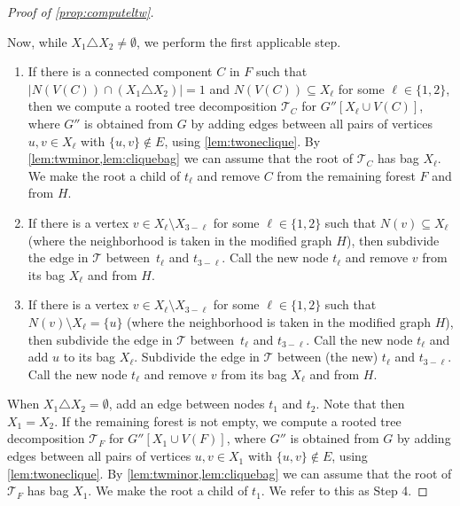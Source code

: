 \documentclass[a4paper,UKenglish,cleveref, autoref, thm-restate, numberwithinsect]{lipics-v2021}
\begin{document}
\begin{proof}[Proof of \cref{prop:computeltw}]
\begin{itemize}
\end{itemize}
Now, while $X_1\triangle X_2\neq \emptyset$, we perform the first applicable step.
\begin{enumerate}
\item If there is a connected component $C$ in $F$ such that $|N(V(C))\cap (X_1\triangle X_2)|=1$ and $N(V(C))\subseteq X_\ell$ for some $\ell\in\{1,2\}$, then we compute a rooted tree decomposition $\mathcal{T}_C$ for $G''[X_\ell\cup V(C)]$, where $G''$ is obtained from $G$ by adding edges between all pairs of vertices $u,v\in  X_\ell$ with $\{u,v\}\notin E$, using \cref{lem:twoneclique}. By \cref{lem:twminor,lem:cliquebag} we can assume that the root of $\mathcal{T}_C$ has bag $X_\ell$. We make the root a child of $t_\ell$ and remove $C$ from the remaining forest $F$ and from $H$. \label{ltw:1}
\item If there is a vertex $v\in X_\ell\setminus X_{3-\ell}$  for some $\ell\in\{1,2\}$ such that $N(v)\subseteq X_\ell$ (where the neighborhood is taken in the modified graph $H$), then subdivide the edge in $\mathcal{T}$ between~$t_\ell$ and $t_{3-\ell}$. Call the new node $t_\ell$ and remove $v$ from its bag $X_\ell$ and from $H$.\label{ltw:2}
\item If there is a vertex $v\in X_\ell\setminus X_{3-\ell}$  for some $\ell\in\{1,2\}$ such that $N(v)\setminus X_\ell=\{u\}$ (where the neighborhood is taken in the modified graph $H$), then subdivide the edge in $\mathcal{T}$ between~$t_\ell$ and $t_{3-\ell}$. Call the new node $t_\ell$ and add $u$ to its bag $X_\ell$. 
Subdivide the edge in $\mathcal{T}$ between (the new) $t_\ell$ and $t_{3-\ell}$. Call the new node $t_\ell$ and remove $v$ from its bag $X_\ell$ and from $H$.\label{ltw:3}
\end{enumerate}
When $X_1\triangle X_2= \emptyset$, add an edge between nodes $t_1$ and $t_2$. Note that then $X_1=X_2$. If the remaining forest is not empty, we compute a rooted tree decomposition $\mathcal{T}_F$ for $G''[X_1\cup V(F)]$, where $G''$ is obtained from $G$ by adding edges between all pairs of vertices $u,v\in  X_1$ with $\{u,v\}\notin E$, using \cref{lem:twoneclique}. By \cref{lem:twminor,lem:cliquebag} we can assume that the root of $\mathcal{T}_F$ has bag $X_1$. We make the root a child of $t_1$. We refer to this as Step 4.


\end{proof}
\end{document}
